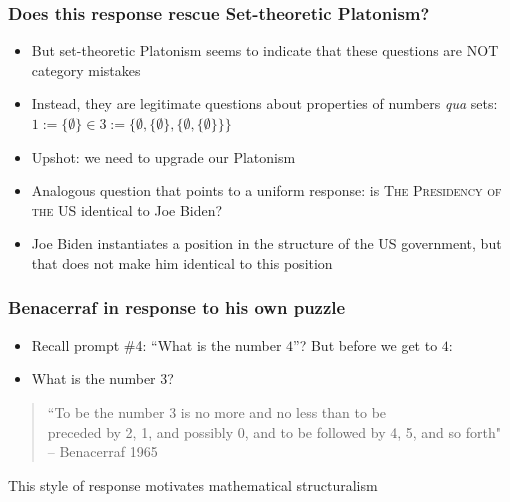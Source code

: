 \begin{frame}
\frametitle{Does this response rescue Set-theoretic Platonism?}

\begin{itemize}[<+->]

\item But set-theoretic Platonism seems to indicate that these questions are NOT category mistakes

\item Instead, they are legitimate questions about properties of numbers \textit{qua} sets: $1 := \{\emptyset\} \in 3 :=  \{\emptyset, \{\emptyset\}, \{\emptyset, \{\emptyset\} \} \}$

\item Upshot: we need to upgrade our Platonism

\item Analogous question that points to a uniform response: is \textsc{The Presidency of the US} identical to Joe Biden? 

\item Joe Biden instantiates a position in the structure of the US government, but that does not make him identical to this position


\end{itemize}
\end{frame}

\begin{frame}
\frametitle{Benacerraf in response to his own puzzle}
\begin{itemize}[<+->]

\item Recall prompt \#4: ``What is the number $4$''? But before we get to $4$:

\item What is the number $3$? 

\end{itemize}

\bigskip 

\pause 
\begin{quote}
``To be the number 3 is no more and no less than to be \\ preceded by 2, 1, and possibly 0, and to be followed by 4, 5, and so forth" -- Benacerraf 1965
\end{quote}
\pause 
This style of response motivates mathematical structuralism 

\end{frame}

